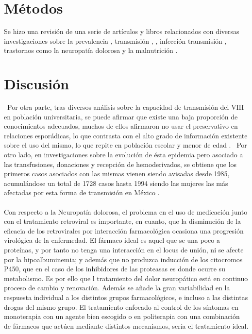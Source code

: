 \documentclass[a4paper,twocolumn,10pt]{article}
\begin{document}
\section{Métodos}
Se hizo una revisión de una serie de artículos y libros relacionados con diversas investigaciones sobre la prevalencia \cite{Marco2012}, transmisión \cite{LinaMariaVera2004}, \cite{Sepulveda-Amor1995}, infección-transmisión \cite{Castillo2004}, trastornos como la neuropatía dolorosa \cite{Ferri2002} y la malnutrición \cite{Herrera2004}. 
\section{Discusión}
\
Por otra parte, tras diversos análisis sobre la capacidad de transmisión del VIH en población universitaria, se puede afirmar que existe una baja proporción de conocimientos adecuados, muchos de ellos afirmaron no usar el preservativo en relaciones esporádicas, lo que contrasta con el alto grado de información existente sobre el uso del mismo, lo que repite en población escolar y menor de edad \cite{LinaMariaVera2004}. \
Por otro lado, en investigaciones sobre la evolución de ésta epidemia pero asociado a las transfusiones, donaciones y recepción de hemoderivados, se obtiene que los primeros casos asociados con las mismas vienen siendo avisadas desde 1985, acumulándose un total de 1728 casos hasta 1994 siendo  las mujeres las más afectadas por esta forma de transmisión en México \cite{Sepulveda-Amor1995}. \\ \\
Con respecto a la Neuropatía dolorosa, el problema en el uso de medicación junto con el tratamiento retroviral es importante, en cuanto, que la disminución de la eficacia de los retrovirales por interacción farmacológica ocasiona una progresión virológica de la enfermedad. El fármaco ideal es aquel que se una poco a proteínas, y por tanto no tenga una interacción en el locus de unión, ni se afecte por la hipoalbuminemia; y además que no produzca inducción de los citocromos P450, que en el caso de los inhibidores de las proteasas es donde ocurre su metabolismo. Es por ello que l tratamiento del dolor neuropático está en continuo proceso de cambio y renovación. Además se añade la gran variabilidad en la respuesta individual a los distintos grupos farmacológicos, e incluso a las distintas drogas del mismo grupo. El tratamiento enfocado al control de los síntomas en monoterapia con un agente bien escogido o en politerapia con una combinación de fármacos que actúen mediante distintos mecanismos, sería el tratamiento ideal.\\ \\
\end{document}
